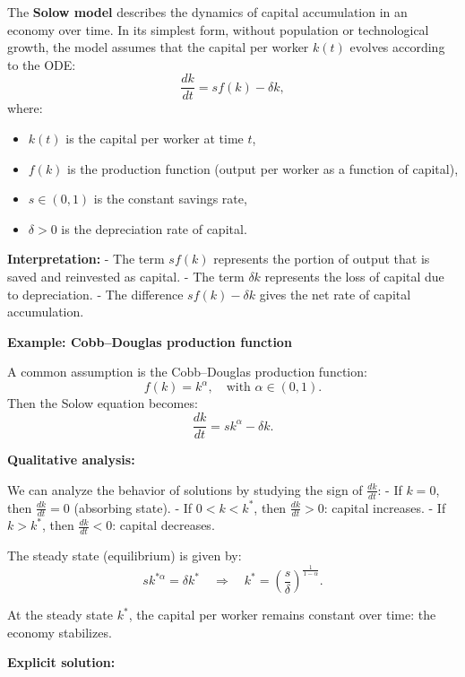 
The \textbf{Solow model} describes the dynamics of capital accumulation in an economy over time. In its simplest form, without population or technological growth, the model assumes that the capital per worker \( k(t) \) evolves according to the ODE:
\[
\frac{dk}{dt} = s f(k) - \delta k,
\]
where:
\begin{itemize}
  \item \( k(t) \) is the capital per worker at time \( t \),
  \item \( f(k) \) is the production function (output per worker as a function of capital),
  \item \( s \in (0,1) \) is the constant savings rate,
  \item \( \delta > 0 \) is the depreciation rate of capital.
\end{itemize}

\textbf{Interpretation:}
- The term \( s f(k) \) represents the portion of output that is saved and reinvested as capital.
- The term \( \delta k \) represents the loss of capital due to depreciation.
- The difference \( s f(k) - \delta k \) gives the net rate of capital accumulation.

\vspace{1em}
\noindent
\textbf{Example: Cobb–Douglas production function}

A common assumption is the Cobb–Douglas production function:
\[
f(k) = k^\alpha, \quad \text{with } \alpha \in (0,1).
\]
Then the Solow equation becomes:
\[
\frac{dk}{dt} = s k^\alpha - \delta k.
\]

\vspace{1em}
\noindent
\textbf{Qualitative analysis:}

We can analyze the behavior of solutions by studying the sign of \( \frac{dk}{dt} \):
- If \( k = 0 \), then \( \frac{dk}{dt} = 0 \) (absorbing state).
- If \( 0 < k < k^* \), then \( \frac{dk}{dt} > 0 \): capital increases.
- If \( k > k^* \), then \( \frac{dk}{dt} < 0 \): capital decreases.

The steady state (equilibrium) is given by:
\[
s k^{*\alpha} = \delta k^* \quad \Rightarrow \quad k^* = \left( \frac{s}{\delta} \right)^{\frac{1}{1 - \alpha}}.
\]

At the steady state \( k^* \), the capital per worker remains constant over time: the economy stabilizes.

\vspace{1em}
\noindent
\textbf{Explicit solution:}

